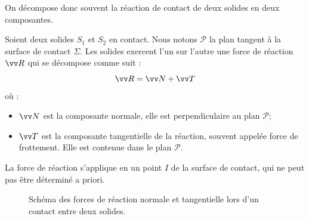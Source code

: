 \documentclass[11pt,fleqn]{book} %
\begin{document}
On décompose donc souvent la réaction de contact de deux solides en deux composantes.

\begin{definition}
    Soient deux solides $S_1$ et $S_2$ en contact. Nous notons $\mathcal{P}$ la plan tangent à la surface de contact $\Sigma$. Les solides exercent l'un sur l'autre une force de réaction $\vv R$ qui se décompose comme suit :
    \begin{equation}
        \vv R = \vv N + \vv T
    \end{equation}
    où :
    \begin{itemize}
        \item $\vv N$ est la composante normale, elle est perpendiculaire au plan  $\mathcal{P}$;
        \item $\vv T$ est la composante tangentielle de la réaction, souvent appelée force de frottement. Elle est contenue dans le plan $\mathcal{P}$.
    \end{itemize}
    La force de réaction s'applique en un point $I$ de la surface de contact, qui ne peut pas être déterminé a priori.
\end{definition}

\begin{figure}[htbp]
    \centering
    \caption{Schéma des forces de réaction normale et tangentielle lors d'un contact entre deux solides.}
    \label{fig:contact}
\end{figure}
\end{document}

